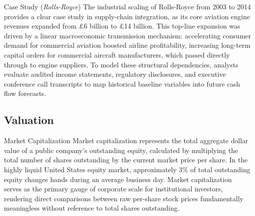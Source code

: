 \documentclass[10pt]{article}
\begin{document}
    \begin{core}{Case Study (\textit{Rolls-Royce})}
      The industrial scaling of Rolls-Royce from 2003 to 2014 provides a clear case study in supply-chain integration, as its core aviation engine revenues expanded from £6 billion to £14 billion. This top-line expansion was driven by a linear macroeconomic transmission mechanism: accelerating consumer demand for commercial aviation boosted airline profitability, increasing long-term capital orders for commercial aircraft manufacturers, which passed directly through to engine suppliers. To model these structural dependencies, analysts evaluate audited income statements, regulatory disclosures, and executive conference call transcripts to map historical baseline variables into future cash flow forecasts.
    \end{core}

  \subsection{Valuation}

    \begin{core}{Market Capitalization}
      Market capitalization represents the total aggregate dollar value of a public company's outstanding equity, calculated by multiplying the total number of shares outstanding by the current market price per share. In the highly liquid United States equity market, approximately 3\% of total outstanding equity changes hands during an average business day. Market capitalization serves as the primary gauge of corporate scale for institutional investors, rendering direct comparisons between raw per-share stock prices fundamentally meaningless without reference to total shares outstanding.
    \end{core}
\end{document}

